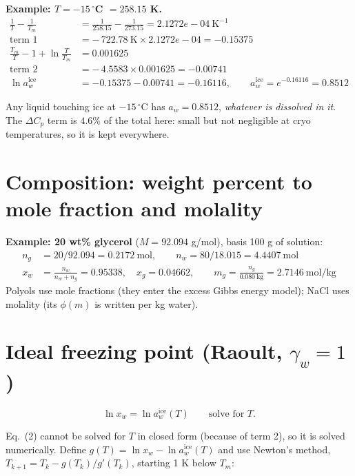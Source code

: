 \documentclass[11pt,a4paper]{article}
\newcommand{\aice}{\ln a_w^{\mathrm{ice}}}
\begin{document}
\textbf{Example: $T=-15\,^\circ$C $=258.15$ K.}
\begin{align*}
\tfrac1T-\tfrac1{T_m} &= \tfrac1{258.15}-\tfrac1{273.15}=2.1272e-04\ \text{K}^{-1}\\
\text{term 1} &= -\,722.78\ \text{K}\times2.1272e-04=-0.15375\\
\tfrac{T_m}{T}-1+\ln\tfrac{T}{T_m} &= 0.001625\\
\text{term 2} &= -\,4.5583\times0.001625=-0.00741\\
\aice &= -0.15375-0.00741=\mathbf{-0.16116},\qquad a_w^{\text{ice}}=e^{-0.16116}=\mathbf{0.8512}
\end{align*}
\begin{result}
Any liquid touching ice at $-15\,^\circ$C has $a_w=0.8512$, \emph{whatever is dissolved in it}. The $\Delta C_p$ term is
$4.6$\% of the total here: small but not negligible at cryo temperatures, so it is kept everywhere.
\end{result}

\section{Composition: weight percent to mole fraction and molality}
\textbf{Example: 20 wt\% glycerol} ($M=92.094$ g/mol), basis 100 g of solution:
\begin{align*}
n_g&=20/92.094=0.2172\ \text{mol},\qquad n_w=80/18.015=4.4407\ \text{mol}\\
x_w&=\frac{n_w}{n_w+n_g}=\mathbf{0.95338},\quad x_g=0.04662,\qquad m_g=\frac{n_g}{0.080\ \text{kg}}=2.7146\ \text{mol/kg}
\end{align*}
Polyols use mole fractions (they enter the excess Gibbs energy model); NaCl uses molality (its $\phi(m)$ is written per kg water).

\section{Ideal freezing point (Raoult, $\gamma_w=1$)}
\begin{eqbox}
\[ \ln x_w=\aice(T)\qquad\text{solve for } T. \tag{2}\]
\end{eqbox}
Eq.~(2) cannot be solved for $T$ in closed form (because of term 2), so it is solved numerically. Define
$g(T)=\ln x_w-\aice(T)$ and use Newton's method, $T_{k+1}=T_k-g(T_k)/g'(T_k)$, starting 1 K below $T_m$:
\end{document}
